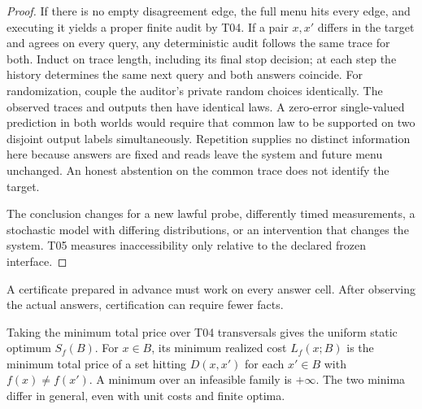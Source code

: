 \begin{proof}

If there is no empty disagreement edge, the full menu hits every edge, and executing it yields a proper finite audit by T04. If a pair \(x,x'\) differs in the target and agrees on every query, any deterministic audit follows the same trace for both. Induct on trace length, including its final stop decision; at each step the history determines the same next query and both answers coincide. For randomization, couple the auditor's private random choices identically. The observed traces and outputs then have identical laws. A zero-error single-valued prediction in both worlds would require that common law to be supported on two disjoint output labels simultaneously. Repetition supplies no distinct information here because answers are fixed and reads leave the system and future menu unchanged. An honest abstention on the common trace does not identify the target.

The conclusion changes for a new lawful probe, differently timed measurements, a stochastic model with differing distributions, or an intervention that changes the system. T05 measures inaccessibility only relative to the declared frozen interface.

\end{proof}

A certificate prepared in advance must work on every answer cell. After observing the actual answers, certification can require fewer facts.

\begin{theorem}\label{thm:t06}

Taking the minimum total price over T04 transversals gives the uniform static optimum \(S_f(B)\). For \(x\in B\), its minimum realized cost \(L_f(x;B)\) is the minimum total price of a set hitting \(D(x,x')\) for each \(x'\in B\) with \(f(x)\ne f(x')\). A minimum over an infeasible family is \(+\infty\). The two minima differ in general, even with unit costs and finite optima.

\end{theorem}

